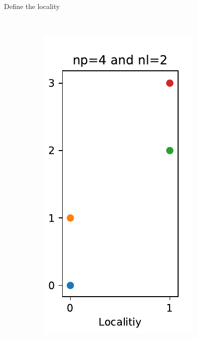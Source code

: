 \documentclass[\classoption]{beamer}
\begin{document}
\begin{frame}[fragile]{Define the locality}
\begin{figure}
\begin{subfigure}[b]{0.3\textwidth}
    \end{subfigure}
    ~ %
    \begin{subfigure}[b]{0.3\textwidth}
        \includegraphics[width=\textwidth]{./images/partition1}

\end{subfigure}
\end{figure}
\end{frame}
\end{document}
